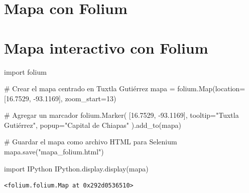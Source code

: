 \documentclass[
  letterpaper,
  DIV=11,
  numbers=noendperiod]{scrreprt}
\newenvironment{Shaded}{\begin{snugshade}}{\end{snugshade}}
\newcommand{\CommentTok}[1]{\textcolor[rgb]{0.37,0.37,0.37}{#1}}
\newcommand{\DecValTok}[1]{\textcolor[rgb]{0.68,0.00,0.00}{#1}}
\newcommand{\FloatTok}[1]{\textcolor[rgb]{0.68,0.00,0.00}{#1}}
\newcommand{\ImportTok}[1]{\textcolor[rgb]{0.00,0.46,0.62}{#1}}
\newcommand{\NormalTok}[1]{\textcolor[rgb]{0.00,0.23,0.31}{#1}}
\newcommand{\OperatorTok}[1]{\textcolor[rgb]{0.37,0.37,0.37}{#1}}
\newcommand{\StringTok}[1]{\textcolor[rgb]{0.13,0.47,0.30}{#1}}
\begin{document}

\chapter{Mapa con Folium}\label{mapa-con-folium}


\chapter{Mapa interactivo con Folium}\label{mapa-interactivo-con-folium}

\begin{Shaded}
\begin{Highlighting}[]
\ImportTok{import}\NormalTok{ folium}

\CommentTok{\# Crear el mapa centrado en Tuxtla Gutiérrez}
\NormalTok{mapa }\OperatorTok{=}\NormalTok{ folium.Map(location}\OperatorTok{=}\NormalTok{[}\FloatTok{16.7529}\NormalTok{, }\OperatorTok{{-}}\FloatTok{93.1169}\NormalTok{], zoom\_start}\OperatorTok{=}\DecValTok{13}\NormalTok{)}

\CommentTok{\# Agregar un marcador}
\NormalTok{folium.Marker(}
\NormalTok{    [}\FloatTok{16.7529}\NormalTok{, }\OperatorTok{{-}}\FloatTok{93.1169}\NormalTok{],}
\NormalTok{    tooltip}\OperatorTok{=}\StringTok{"Tuxtla Gutiérrez"}\NormalTok{,}
\NormalTok{    popup}\OperatorTok{=}\StringTok{"Capital de Chiapas"}
\NormalTok{).add\_to(mapa)}

\CommentTok{\# Guardar el mapa como archivo HTML para Selenium}
\NormalTok{mapa.save(}\StringTok{"mapa\_folium.html"}\NormalTok{)}
\end{Highlighting}
\end{Shaded}

\begin{Shaded}
\begin{Highlighting}[]
\ImportTok{import}\NormalTok{ IPython}
\NormalTok{IPython.display.display(mapa)}
\end{Highlighting}
\end{Shaded}

\begin{verbatim}
<folium.folium.Map at 0x292d0536510>
\end{verbatim}
\end{document}
